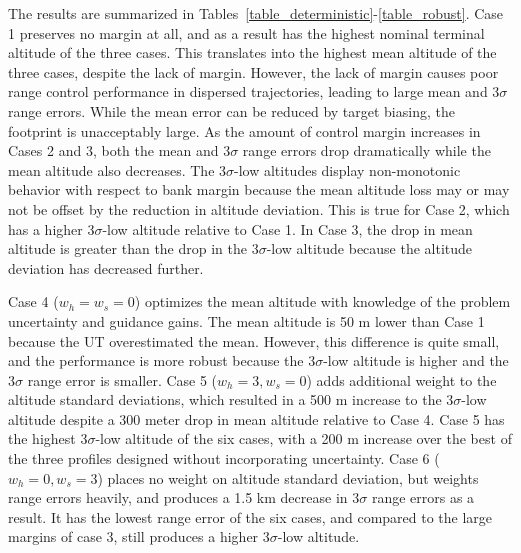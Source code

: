 \documentclass[journal ]{new-aiaa}
\begin{document}
The results are summarized in Tables~\ref{table_deterministic}-\ref{table_robust}. Case 1 preserves no margin at all, and as a result has the highest nominal terminal altitude of the three cases. This translates into the highest mean altitude of the three cases, despite the lack of margin. However, the lack of margin causes poor range control performance in dispersed trajectories, leading to large mean and 3$\sigma$ range errors. While the mean error can be reduced by target biasing, the footprint is unacceptably large. As the amount of control margin increases in Cases 2 and 3, both the mean and 3$\sigma$ range errors drop dramatically while the mean altitude also decreases. The 3$\sigma$-low altitudes display non-monotonic behavior with respect to bank margin because the mean altitude loss may or may not be offset by the reduction in altitude deviation. This is true for Case 2, which has a higher 3$\sigma$-low altitude relative to Case 1. In Case 3, the drop in mean altitude is greater than the drop in the 3$\sigma$-low altitude because the altitude deviation has decreased further. 

Case 4 ($ w_h=w_s=0 $) optimizes the mean altitude with knowledge of the problem uncertainty and guidance gains. The mean altitude is 50 m lower than Case 1 because the UT overestimated the mean. However, this difference is quite small, and the performance is more robust because the 3$\sigma$-low altitude is higher and the 3$\sigma$ range error is smaller. Case 5 ($ w_h=3,w_s=0 $) adds additional weight to the altitude standard deviations, which resulted in a 500 m increase to the 3$\sigma$-low altitude despite a 300 meter drop in mean altitude relative to Case 4. Case 5 has the highest 3$\sigma$-low altitude of the six cases, with a 200 m increase over the best of the three profiles designed without incorporating uncertainty. Case 6 ($ w_h=0, w_s=3$) places no weight on altitude standard deviation, but weights range errors heavily, and produces a 1.5 km decrease in 3$\sigma$ range errors as a result. It has the lowest range error of the six cases, and compared to the large margins of case 3, still produces a higher 3$\sigma$-low altitude.
\end{document}
